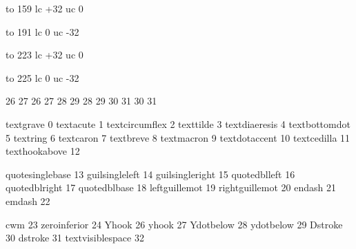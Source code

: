 

\startencoding[t5]

 to 159 lc +32 uc   0

 to 191 lc   0 uc -32

 to 223 lc +32 uc   0

 to 225 lc   0 uc -32

 26 27  26 27
 28 29  28 29
 30 31  30 31

 textgrave             0
 textacute             1
 textcircumflex        2
 texttilde             3
 textdiaeresis         4
 textbottomdot         5
 textring              6
 textcaron             7
 textbreve             8
 textmacron            9
 textdotaccent        10
 textcedilla          11
 texthookabove        12

 quotesinglebase      13
 guilsingleleft       14
 guilsingleright      15
 quotedblleft         16
 quotedblright        17
 quotedblbase         18
 leftguillemot        19
 rightguillemot       20
 endash               21
 emdash               22

 cwm                  23
 zeroinferior         24
 Yhook                26
 yhook                27
 Ydotbelow            28
 ydotbelow            29
 Dstroke              30
 dstroke              31
 textvisiblespace     32

